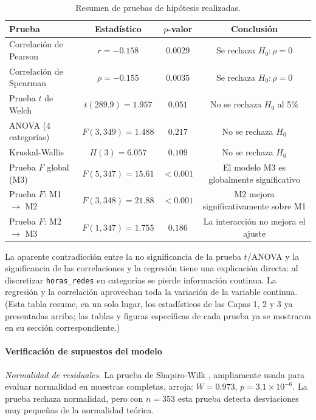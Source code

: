 \documentclass[12pt]{article}
\begin{document}
\begin{table}[H]
\centering
\caption{Resumen de pruebas de hipótesis realizadas.}
\begin{tabular}{lccc}
\toprule
Prueba & Estadístico & \(p\)-valor & Conclusión \\
\midrule
Correlación de Pearson & \(r = -0.158\) & \(0.0029\) & Se rechaza \(H_0: \rho = 0\) \\
Correlación de Spearman & \(\rho = -0.155\) & \(0.0035\) & Se rechaza \(H_0: \rho = 0\) \\
Prueba \(t\) de Welch & \(t(289.9) = 1.957\) & \(0.051\) & No se rechaza \(H_0\) al 5\% \\
ANOVA (4 categorías) & \(F(3, 349) = 1.488\) & \(0.217\) & No se rechaza \(H_0\) \\
Kruskal-Wallis & \(H(3) = 6.057\) & \(0.109\) & No se rechaza \(H_0\) \\
Prueba \(F\) global (M3) & \(F(5, 347) = 15.61\) & \(< 0.001\) & El modelo M3 es globalmente significativo \\
Prueba \(F\): M1 \(\rightarrow\) M2 & \(F(3, 348) = 21.88\) & \(< 0.001\) & M2 mejora significativamente sobre M1 \\
Prueba \(F\): M2 \(\rightarrow\) M3 & \(F(1, 347) = 1.755\) & \(0.186\) & La interacción no mejora el ajuste \\
\bottomrule
\end{tabular}
\label{tab:pruebas_hipotesis}
\end{table}

La aparente contradicción entre la no significancia de la prueba \(t\)/ANOVA y la significancia de las correlaciones y la regresión tiene una explicación directa: al discretizar \texttt{horas\_redes} en categorías se pierde información continua. La regresión y la correlación aprovechan toda la variación de la variable continua. (Esta tabla resume, en un solo lugar, los estadísticos de las Capas 1, 2 y 3 ya presentadas arriba; las tablas y figuras específicas de cada prueba ya se mostraron en su sección correspondiente.)

\paragraph{Verificación de supuestos del modelo}

\textit{Normalidad de residuales.} La prueba de Shapiro-Wilk \cite{shapirowilk1965}, ampliamente usada para evaluar normalidad en muestras completas, arroja: \(W = 0.973\), \(p = 3.1 \times 10^{-6}\). La prueba rechaza normalidad, pero con \(n = 353\) esta prueba detecta desviaciones muy pequeñas de la normalidad teórica.
\end{document}
